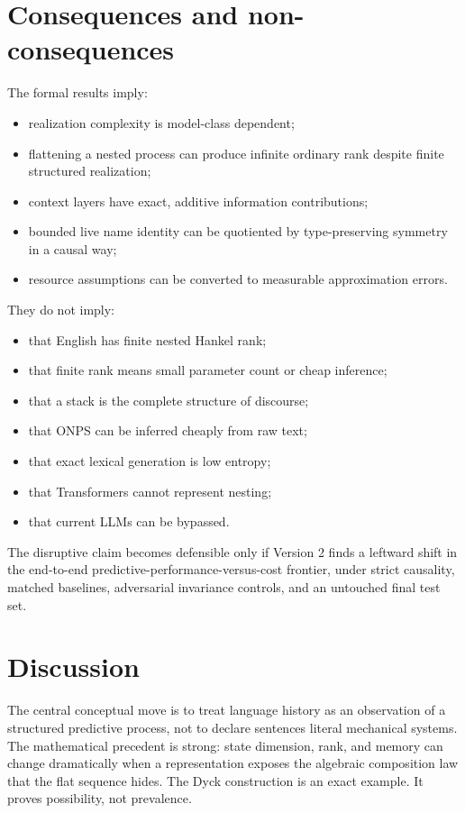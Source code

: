 \documentclass[11pt]{article}
\begin{document}
\section{Consequences and non-consequences}\label{consequences-and-non-consequences}

The formal results imply:

\begin{itemize}
\item
  realization complexity is model-class dependent;
\item
  flattening a nested process can produce infinite ordinary rank despite finite structured realization;
\item
  context layers have exact, additive information contributions;
\item
  bounded live name identity can be quotiented by type-preserving symmetry in a causal way;
\item
  resource assumptions can be converted to measurable approximation errors.
\end{itemize}

They do not imply:

\begin{itemize}
\item
  that English has finite nested Hankel rank;
\item
  that finite rank means small parameter count or cheap inference;
\item
  that a stack is the complete structure of discourse;
\item
  that ONPS can be inferred cheaply from raw text;
\item
  that exact lexical generation is low entropy;
\item
  that Transformers cannot represent nesting;
\item
  that current LLMs can be bypassed.
\end{itemize}

The disruptive claim becomes defensible only if Version 2 finds a leftward shift in the end-to-end predictive-performance-versus-cost frontier, under strict causality, matched baselines, adversarial invariance controls, and an untouched final test set.

\section{Discussion}\label{discussion}

The central conceptual move is to treat language history as an observation of a structured predictive process, not to declare sentences literal mechanical systems. The mathematical precedent is strong: state dimension, rank, and memory can change dramatically when a representation exposes the algebraic composition law that the flat sequence hides. The Dyck construction is an exact example. It proves possibility, not prevalence.
\end{document}
